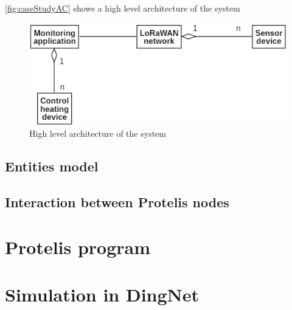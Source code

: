 \autoref{fig:caseStudyAC} shows a high level architecture of the system
\begin{figure}[h]
    \centering
    \includegraphics{figures/ACapp.png}
    \caption{High level architecture of the system}
    \label{fig:caseStudyAC}
\end{figure}

\subsection*{Entities model}

\subsection*{Interaction between Protelis nodes}

\section{Protelis program}


\section{Simulation in DingNet}
